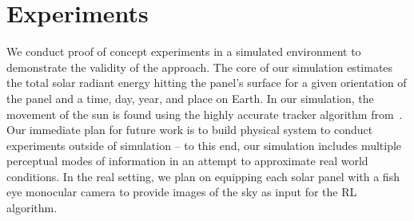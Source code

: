 \documentclass[11pt]{article}
\newcommand{\dnote}[1]{\textcolor{blue}{Dave: #1}}
\begin{document}


\section{Experiments}

We conduct proof of concept experiments in a simulated environment to demonstrate the validity of the approach. The core of our simulation estimates the total solar radiant energy hitting the panel's surface for a given orientation of the panel and a time, day, year, and place on Earth. In our simulation, the movement of the sun is found using the highly accurate tracker algorithm from~\citet{reda2004solar}. Our immediate plan for future work is to build physical system to conduct experiments outside of simulation -- to this end, our simulation includes multiple perceptual modes of information in an attempt to approximate real world conditions. In the real setting, we plan on equipping each solar panel with a fish eye monocular camera to provide images of the sky as input for the RL algorithm. %
\end{document}
